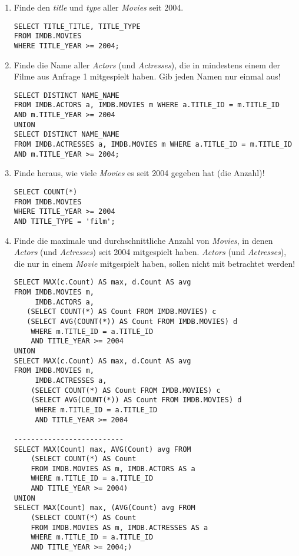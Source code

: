\documentclass[11pt,a4paper,DIV=9]{scrartcl}
\begin{document}
\begin{enumerate}

\item Finde den \textit{title} und \textit{type} aller \textit{Movies} seit 2004. 
\begin{lstlisting} 
SELECT TITLE_TITLE, TITLE_TYPE
FROM IMDB.MOVIES
WHERE TITLE_YEAR >= 2004;
\end{lstlisting}

\item Finde die Name aller \textit{Actors} (und \textit{Actresses}), die in mindestens einem der Filme aus Anfrage 1 mitgespielt haben. Gib jeden Namen nur einmal aus!
\begin{lstlisting}
SELECT DISTINCT NAME_NAME
FROM IMDB.ACTORS a, IMDB.MOVIES m WHERE a.TITLE_ID = m.TITLE_ID
AND m.TITLE_YEAR >= 2004
UNION
SELECT DISTINCT NAME_NAME
FROM IMDB.ACTRESSES a, IMDB.MOVIES m WHERE a.TITLE_ID = m.TITLE_ID
AND m.TITLE_YEAR >= 2004;
\end{lstlisting}

\item Finde heraus, wie viele \textit{Movies} es seit 2004 gegeben hat (die Anzahl)!
\begin{lstlisting}
SELECT COUNT(*)
FROM IMDB.MOVIES
WHERE TITLE_YEAR >= 2004
AND TITLE_TYPE = 'film';
\end{lstlisting}

\item Finde die maximale und durchschnittliche Anzahl von \textit{Movies}, in denen \textit{Actors} (und \textit{Actresses}) seit 2004 mitgespielt haben. \textit{Actors} (und \textit{Actresses}), die nur in einem \textit{Movie} mitgespielt haben, sollen nicht mit betrachtet werden!
\begin{lstlisting}
SELECT MAX(c.Count) AS max, d.Count AS avg
FROM IMDB.MOVIES m,
  	 IMDB.ACTORS a,
   (SELECT COUNT(*) AS Count FROM IMDB.MOVIES) c
   (SELECT AVG(COUNT(*)) AS Count FROM IMDB.MOVIES) d 
	WHERE m.TITLE_ID = a.TITLE_ID
	AND TITLE_YEAR >= 2004
UNION
SELECT MAX(c.Count) AS max, d.Count AS avg
FROM IMDB.MOVIES m,
	 IMDB.ACTRESSES a,
	(SELECT COUNT(*) AS Count FROM IMDB.MOVIES) c
	(SELECT AVG(COUNT(*)) AS Count FROM IMDB.MOVIES) d
	 WHERE m.TITLE_ID = a.TITLE_ID
	 AND TITLE_YEAR >= 2004

--------------------------
SELECT MAX(Count) max, AVG(Count) avg FROM
	(SELECT COUNT(*) AS Count
	FROM IMDB.MOVIES AS m, IMDB.ACTORS AS a
	WHERE m.TITLE_ID = a.TITLE_ID
	AND TITLE_YEAR >= 2004)
UNION
SELECT MAX(Count) max, (AVG(Count) avg FROM
	(SELECT COUNT(*) AS Count
	FROM IMDB.MOVIES AS m, IMDB.ACTRESSES AS a
	WHERE m.TITLE_ID = a.TITLE_ID
	AND TITLE_YEAR >= 2004;)
\end{lstlisting}


\end{enumerate}
\end{document}
